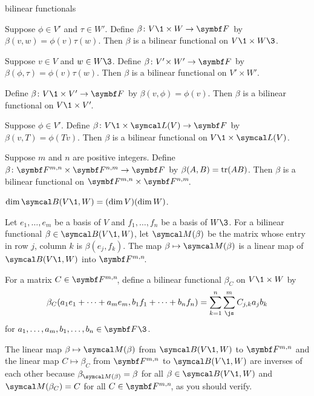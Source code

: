 \begin{example}{bilinear functionals}
\begin{Itemize}
\item
Suppose $\phi \in V'$ and $\tau \in W'\!$. Define $\fun \beta {V\1 \times W} {\F{}}$ by $\beta(v, w) = \phi(v) \tau(w)$. Then $\beta$ is a bilinear functional on $V\1 \times W\3$.

\item
Suppose $v \in V$ and $w \in W\3$. Define $\fun \beta {V'\! \times W'} {\F{}}$ by $\beta(\phi, \tau) = \phi(v) \tau(w)$. Then $\beta$ is a bilinear functional on $V'\! \times W'\!$.

\item
Define $\fun \beta {V\1 \times V'} {\F{}}$ by $\beta(v, \phi) = \phi(v)$. Then $\beta$ is a bilinear functional on $V\1 \times V'\!$.

\item
Suppose $\phi \in V'\!$. Define $\fun \beta {V\1 \times \L(V)} {\F{}}$ by $\beta(v, T) = \phi(Tv)$. Then $\beta$ is a bilinear functional on
$V\1 \times \L(V)$.

\item
Suppose $m$ and $n$ are positive integers. Define $\fun \beta { \F{m, n} \times \F{n,m} } {\F{}}$ by
$\beta(A, B) = \operatorname{tr}(AB)$. Then $\beta$ is a bilinear functional on $\F{m, n} \times \F{n,m}\!$.
\end{Itemize}
\exampleitemend
\end{example}

{$\dim \B(V\1,W) = (\dim V)(\dim W)$.}

\proof
Let $e_1, \ldots, e_m$ be a basis of $V$ and $f_1, \ldots, f_n$ be a basis of $W\3$. For a bilinear functional $\beta \in \B(V\1,W)$, let $\M(\beta)$ be the  matrix whose entry in row $j$, column $k$ is $\beta(e_j, f_k)$.
The map $\beta \mapsto \M(\beta)$ is a linear map of $\B(V\1,W)$ into $\FF{m,n}$.

For a matrix $C \in \FF{m,n}$, define a bilinear functional $\beta_C$ on $V\1 \times W$ by
\[
\beta_C( a_1 e_1+ \cdots + a_m e_m, b_1 f_1 + \cdots + b_n f_n ) = \sum_{k=1}^n \sum_{\js}^m C_{j,k} a_j b_k
\]
for $a_1, \ldots, a_m, b_1, \ldots, b_n \in \F{}\3$.

The linear map $\beta \mapsto \M(\beta)$ from $\B(V\1, W)$ to $\F{m,n}$ and the linear map $C \mapsto \beta_C$ from
$\F{m,n}$ to $\B(V\1,W)$ are inverses of each other because $\beta_{\M(\beta)} = \beta$ for all $\beta \in \B(V\1, W)$ and
$\M(\beta_C) = C$ for all $C \in \FF{m,n}$, as you should verify.

